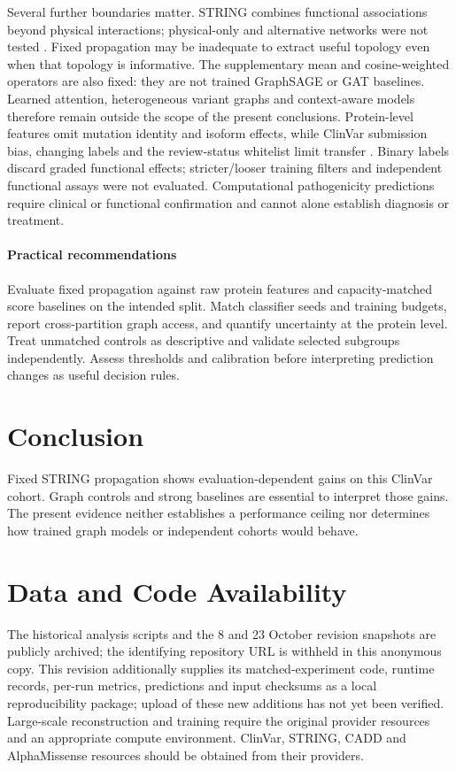 \documentclass[conference]{IEEEtran}
\begin{document}
Several further boundaries matter. STRING combines functional associations beyond physical interactions; physical-only and alternative networks were not tested \cite{Szklarczyk2023STRING}. Fixed propagation may be inadequate to extract useful topology even when that topology is informative. The supplementary mean and cosine-weighted operators are also fixed: they are not trained GraphSAGE or GAT baselines. Learned attention, heterogeneous variant graphs and context-aware models therefore remain outside the scope of the present conclusions. Protein-level features omit mutation identity and isoform effects, while ClinVar submission bias, changing labels and the review-status whitelist limit transfer \cite{Landrum2020ClinVar}. Binary labels discard graded functional effects; stricter/looser training filters and independent functional assays were not evaluated. Computational pathogenicity predictions require clinical or functional confirmation and cannot alone establish diagnosis or treatment.

\paragraph{Practical recommendations}
Evaluate fixed propagation against raw protein features and capacity-matched score baselines on the intended split. Match classifier seeds and training budgets, report cross-partition graph access, and quantify uncertainty at the protein level. Treat unmatched controls as descriptive and validate selected subgroups independently. Assess thresholds and calibration before interpreting prediction changes as useful decision rules.

\section{Conclusion}
Fixed STRING propagation shows evaluation-dependent gains on this ClinVar cohort. Graph controls and strong baselines are essential to interpret those gains. The present evidence neither establishes a performance ceiling nor determines how trained graph models or independent cohorts would behave.

\section*{Data and Code Availability}

The historical analysis scripts and the 8 and 23 October revision snapshots are publicly archived; the identifying repository URL is withheld in this anonymous copy. This revision additionally supplies its matched-experiment code, runtime records, per-run metrics, predictions and input checksums as a local reproducibility package; upload of these new additions has not yet been verified. Large-scale reconstruction and training require the original provider resources and an appropriate compute environment. ClinVar, STRING, CADD and AlphaMissense resources should be obtained from their providers.
\end{document}
